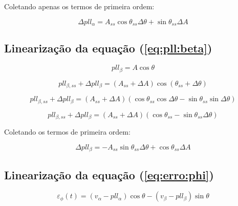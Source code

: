 \documentclass[12pt,a4paper]{report}
\begin{document}
Coletando apenas os termos de primeira ordem:

\begin{equation}
\Delta pll_{\alpha} = 
A_{ss} \cos \theta_{ss} \Delta \theta +
\sin \theta_{ss} \Delta A
\label{eq:pll:alpha:Lin}
\end{equation}



\subsection{Linearização da equação (\ref{eq:pll:beta})}

\begin{equation}
pll_\beta = A \cos \theta
\end{equation}

\begin{equation}
pll_{\beta,ss} + \Delta pll_{\beta} = 
\left(
A_{ss} + \Delta A
\right)
\cos (\theta_{ss} + \Delta \theta )
\end{equation}

\begin{equation}
pll_{\beta,ss} + \Delta pll_{\beta} = 
\left(
A_{ss} + \Delta A
\right)
\left(
\cos \theta_{ss} \cos \Delta \theta -
\sin \theta_{ss} \sin \Delta \theta
\right)
\end{equation}



\begin{equation}
pll_{\beta,ss} + \Delta pll_{\beta} = 
\left(
A_{ss} + \Delta A
\right)
\left(
\cos \theta_{ss}  -
\sin \theta_{ss} \Delta \theta
\right)
\end{equation}


Coletando os termos de primeira ordem:

\begin{equation}
\Delta pll_{\beta} = 
- A_{ss} \sin \theta_{ss} \Delta \theta +
\cos \theta_{ss} \Delta A
\label{eq:pll:beta:Lin}
\end{equation}




\subsection{Linearização da equação (\ref{eq:erro:phi})}

\begin{equation}
\varepsilon_\phi(t)=
\left(
v_\alpha - pll_\alpha
\right)
\cos \theta -
\left(
v_\beta - pll_\beta
\right)
\sin \theta
\end{equation}
\end{document}
